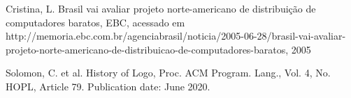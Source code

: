 \documentclass[
12pt,		%
openright,	%
twoside,  %
a4paper,			%
chapter=TITLE,		%
english,			%
french,				%
spanish,			%
brazil				%
]{USPSC-classe/USPSC}
\begin{document}
\begin{flushleft}
\begin{flushleft}
\begin{flushleft}
\begin{flushleft}
\begin{flushleft}
\begin{flushleft}
\begin{flushleft}
\begin{flushleft}
[CRISTINA, 2005] Cristina, L. Brasil vai avaliar projeto norte-americano de distribui\c{c}\~ao de computadores baratos, EBC, acessado em http://memoria.ebc.com.br/agenciabrasil/noticia/2005-06-28/brasil-vai-avaliar-projeto-norte-americano-de-distribuicao-de-computadores-baratos, 2005
\end{flushleft}


\end{flushleft}


\end{flushleft}


\end{flushleft}


\end{flushleft}


\end{flushleft}


\end{flushleft}


\end{flushleft}


\begin{flushleft}
\begin{flushleft}
\begin{flushleft}
\begin{flushleft}
\begin{flushleft}
\begin{flushleft}
\begin{flushleft}
\begin{flushleft}
[SOLOMON et al., 2020] Solomon, C. et al. History of Logo, Proc. ACM Program. Lang., Vol. 4, No. HOPL, Article 79. Publication date: June 2020.
\end{flushleft}


\end{flushleft}


\end{flushleft}


\end{flushleft}


\end{flushleft}


\end{flushleft}


\end{flushleft}


\end{flushleft}
\end{document}
